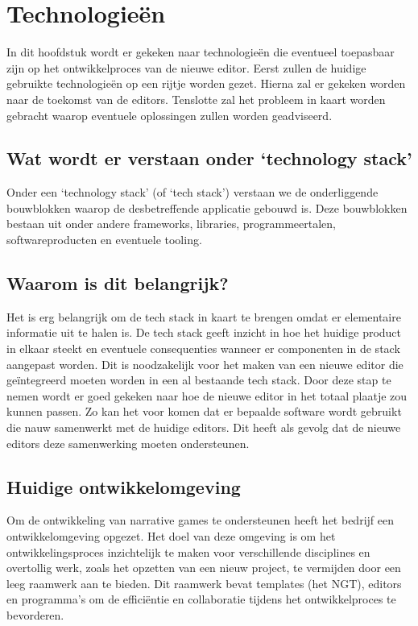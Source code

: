 \chapter{Technologieën}
\label{ch:technologystack}
In dit hoofdstuk wordt er gekeken naar technologieën die eventueel toepasbaar zijn op het ontwikkelproces van de nieuwe editor. Eerst zullen de huidige gebruikte technologieën op een rijtje worden gezet. Hierna zal er gekeken worden naar de toekomst van de editors. Tenslotte zal het probleem in kaart worden gebracht waarop eventuele oplossingen zullen worden geadviseerd.

\section{Wat wordt er verstaan onder ‘technology stack’}
Onder een ‘technology stack’ (of ‘tech stack’) verstaan we de onderliggende bouwblokken waarop de desbetreffende applicatie gebouwd is. Deze bouwblokken bestaan uit onder andere frameworks, libraries, programmeertalen, softwareproducten en eventuele tooling\cite{BlogTechStack}.

\section{Waarom is dit belangrijk?}
Het is erg belangrijk om de tech stack in kaart te brengen omdat er elementaire informatie uit te halen is. De tech stack geeft inzicht in hoe het huidige product in elkaar steekt en eventuele consequenties wanneer er componenten in de stack aangepast worden. Dit is noodzakelijk voor het maken van een nieuwe editor die geïntegreerd moeten worden in een al bestaande tech stack. Door deze stap te nemen wordt er goed gekeken naar hoe de nieuwe editor in het totaal plaatje zou kunnen passen. Zo kan het voor komen dat er bepaalde software wordt gebruikt die nauw samenwerkt met de huidige editors. Dit heeft als gevolg dat de nieuwe editors deze samenwerking moeten ondersteunen.

\section{Huidige ontwikkelomgeving}
Om de ontwikkeling van narrative games te ondersteunen heeft het bedrijf een ontwikkelomgeving opgezet. Het doel van deze omgeving is om het ontwikkelingsproces inzichtelijk te maken voor verschillende disciplines en overtollig werk, zoals het opzetten van een nieuw project, te vermijden door een leeg raamwerk aan te bieden. Dit raamwerk bevat templates (het NGT), editors en programma’s om de efficiëntie en collaboratie tijdens het ontwikkelproces te bevorderen.

